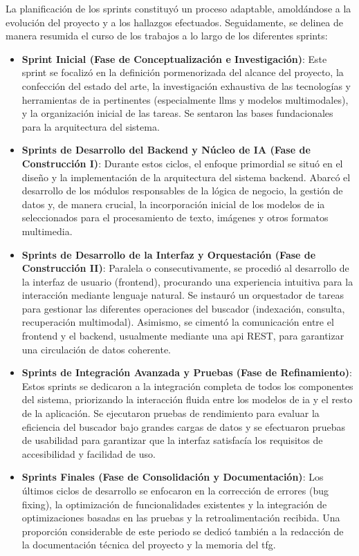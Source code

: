 La planificación de los sprints constituyó un proceso adaptable, amoldándose a la evolución del proyecto y a los hallazgos efectuados. Seguidamente, se delinea de manera resumida el curso de los trabajos a lo largo de los diferentes sprints:

\begin{itemize}
    \item \textbf{Sprint Inicial (Fase de Conceptualización e Investigación)}:
        Este sprint se focalizó en la definición pormenorizada del alcance del proyecto, la confección del estado del arte, la investigación exhaustiva de las tecnologías y herramientas de \gls{ia} pertinentes (especialmente \glspl{llm} y modelos multimodales), y la organización inicial de las tareas. Se sentaron las bases fundacionales para la arquitectura del sistema.

    \item \textbf{Sprints de Desarrollo del Backend y Núcleo de IA (Fase de Construcción I)}:
        Durante estos ciclos, el enfoque primordial se situó en el diseño y la implementación de la arquitectura del sistema backend. Abarcó el desarrollo de los módulos responsables de la lógica de negocio, la gestión de datos y, de manera crucial, la incorporación inicial de los modelos de \gls{ia} seleccionados para el procesamiento de texto, imágenes y otros formatos multimedia.

    \item \textbf{Sprints de Desarrollo de la Interfaz y Orquestación (Fase de Construcción II)}:
        Paralela o consecutivamente, se procedió al desarrollo de la interfaz de usuario (frontend), procurando una experiencia intuitiva para la interacción mediante lenguaje natural. Se instauró un orquestador de tareas para gestionar las diferentes operaciones del buscador (indexación, consulta, recuperación multimodal). Asimismo, se cimentó la comunicación entre el frontend y el backend, usualmente mediante una \gls{api} REST, para garantizar una circulación de datos coherente.

    \item \textbf{Sprints de Integración Avanzada y Pruebas (Fase de Refinamiento)}:
        Estos sprints se dedicaron a la integración completa de todos los componentes del sistema, priorizando la interacción fluida entre los modelos de \gls{ia} y el resto de la aplicación. Se ejecutaron pruebas de rendimiento para evaluar la eficiencia del buscador bajo grandes cargas de datos y se efectuaron pruebas de usabilidad para garantizar que la interfaz satisfacía los requisitos de accesibilidad y facilidad de uso.

    \item \textbf{Sprints Finales (Fase de Consolidación y Documentación)}:
        Los últimos ciclos de desarrollo se enfocaron en la corrección de errores (bug fixing), la optimización de funcionalidades existentes y la integración de optimizaciones basadas en las pruebas y la retroalimentación recibida. Una proporción considerable de este periodo se dedicó también a la redacción de la documentación técnica del proyecto y la memoria del \gls{tfg}.
\end{itemize}

